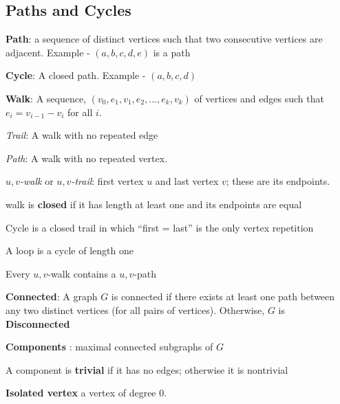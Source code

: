 \documentclass{article}
\theoremstyle{definition}
\theoremstyle{definition}
\newenvironment{manualprop}[1]{%
  \renewcommand\themanualpropinner{#1}%
  \manualpropinner
}{\endmanualpropinner}
\theoremstyle{named}
\begin{document}
\subsection{Paths and Cycles}
\begin{compactitem}
    \item \textbf{Path}: a sequence of distinct vertices such that
two consecutive vertices are adjacent. Example - $(a, b, c, d, e)$ is a path

    \item \textbf{Cycle}: A closed path. Example - $(a, b, c, d)$

    \item \textbf{Walk}: A sequence, $(v_0,e_1,v_1,e_2, ...,  e_k,v_k)$
of vertices and edges such that $e_i = v_{i-1} - v_i$ for all $i$.
    \begin{compactitem}
        \item \textit{Trail}: A walk with no repeated edge
        \item \textit{Path}: A walk with no repeated vertex.
        \item \textit{$u,v$-walk} or \textit{$u,v$-trail}:  first vertex $u$ and last vertex
$v$; these are its endpoints.
        \item walk is \textbf{closed} if it has length at least one and its endpoints are equal
        \begin{compactitem}
            \item Cycle is a closed trail in which “first = last” is the only vertex repetition
            \item A loop is a cycle of length one
        \end{compactitem}
    \end{compactitem}
\end{compactitem}

\begin{manualprop}{31}
    Every $u,v$-walk contains a $u,v$-path
\end{manualprop}

\begin{compactitem}
    \item \textbf{Connected}: A graph $G$ is connected if there exists at least one path between any two distinct vertices (for all pairs of vertices). Otherwise, $G$ is \textbf{Disconnected}
    \item \textbf{Components} : maximal connected subgraphs of $G$
    \item A component is \textbf{trivial} if it has no edges;
otherwise it is nontrivial
    \item \textbf{Isolated vertex} a vertex of degree 0.
    
\end{compactitem}
\end{document}
